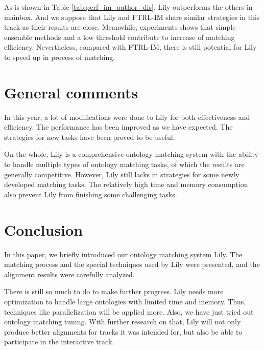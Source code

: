 \documentclass[runningheads]{llncs}
\begin{document}
As is shown in Table \ref{tab:perf_im_author_dis},
Lily outperforms the others in mainbox. 
And we suppose that Lily and FTRL-IM share similar strategies in this track as their results are close.
Meanwhile, experiments shows that simple ensemble methods and a low threshold contribute to increase of matching efficiency.
Nevertheless, compared with FTRL-IM, there is still potential for Lily to speed up in process of matching. \par


\section{General comments}
In this year, a lot of modifications were done to Lily for both effectiveness and efficiency. The performance has been improved as we have expected. The strategies for new tasks have been proved to be useful. \par
On the whole, Lily is a comprehensive ontology matching system with the ability to handle multiple types of ontology matching tasks, of which the results are generally competitive. However, Lily still lacks in strategies for some newly developed matching tasks. The relatively high time and memory consumption also prevent Lily from finishing some challenging tasks. \par

\section{Conclusion}
In this paper, we briefly introduced our ontology matching system Lily. The matching process and the special techniques used by Lily were presented, and the alignment results were carefully analyzed. \par
There is still so much to do to make further progress. Lily needs more optimization to handle large ontologies with limited time and memory. Thus, techniques like parallelization will be applied more. Also, we have just tried out ontology matching tuning. With further research on that, Lily will not only produce better alignments for tracks it was intended for, but also be able to participate in the interactive track. \par

%
%


%

\clearpage
\end{document}
